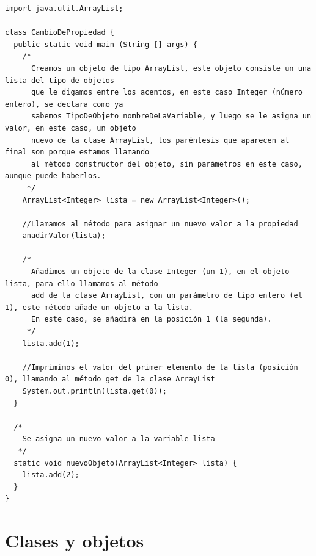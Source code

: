 \documentclass[11pt]{article}
\begin{document}
\begin{verbatim}
import java.util.ArrayList;

class CambioDePropiedad {
  public static void main (String [] args) {
    /*
      Creamos un objeto de tipo ArrayList, este objeto consiste un una lista del tipo de objetos
      que le digamos entre los acentos, en este caso Integer (número entero), se declara como ya
      sabemos TipoDeObjeto nombreDeLaVariable, y luego se le asigna un valor, en este caso, un objeto
      nuevo de la clase ArrayList, los paréntesis que aparecen al final son porque estamos llamando
      al método constructor del objeto, sin parámetros en este caso, aunque puede haberlos.
     */
    ArrayList<Integer> lista = new ArrayList<Integer>();

    //Llamamos al método para asignar un nuevo valor a la propiedad
    anadirValor(lista);

    /*
      Añadimos un objeto de la clase Integer (un 1), en el objeto lista, para ello llamamos al método
      add de la clase ArrayList, con un parámetro de tipo entero (el 1), este método añade un objeto a la lista.
      En este caso, se añadirá en la posición 1 (la segunda).
     */
    lista.add(1);

    //Imprimimos el valor del primer elemento de la lista (posición 0), llamando al método get de la clase ArrayList
    System.out.println(lista.get(0));
  }

  /*
    Se asigna un nuevo valor a la variable lista
   */
  static void nuevoObjeto(ArrayList<Integer> lista) {
    lista.add(2);
  }
}
\end{verbatim}

\section{Clases y objetos}
\label{sec:org5a50bb4}
\end{document}
